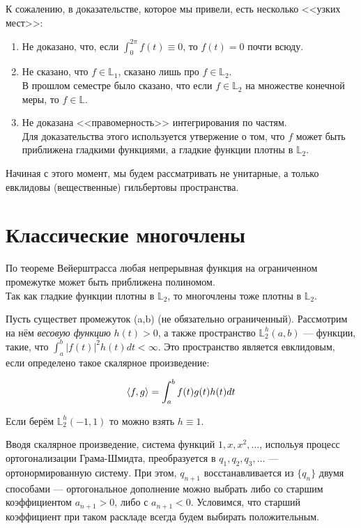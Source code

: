\documentclass[12pt]{article}
\begin{document}
	К сожалению, в доказательстве, которое мы привели, есть несколько <<узких мест>>:
	\begin{enumerate}
		\item Не доказано, что, если $\int_0^{2\pi} f(t) \equiv 0$, то $f(t) = 0$ почти всюду.
		\item Не сказано, что $f \in \mathbb{L}_1$, сказано лишь про $f \in \mathbb{L}_2$. \\
		В прошлом семестре было сказано, что если $f \in \mathbb{L}_2$ на множестве конечной меры, то $f \in \mathbb{L}$.
		\item Не доказана <<правомерность>> интегрирования по частям. \\
		Для доказательства этого используется утвержение о том, что $f$ может быть приближена гладкими функциями, а
		гладкие функции плотны в $\mathbb{L}_2$.
	\end{enumerate}
	
	Начиная с этого момент, мы будем рассматривать не унитарные, а только евклидовы (вещественные) гильбертовы пространства.
	
	\section{Классические многочлены}
	По теореме Вейерштрасса любая непрерывная функция на ограниченном промежутке может быть приближена полиномом. \\
	Так как гладкие функции плотны в $\mathbb{L}_2$, то многочлены тоже плотны в $\mathbb{L}_2$.
	
	Пусть существет промежуток (a,b) (не обязательно ограниченный). Рассмотрим на нём \textit{весовую функцию} 
	$h(t) > 0$, а также пространство
	$\mathbb{L}_2^h (a,b)$ --- функции, такие, что $\int_a^b |f(t)|^2 h(t) dt < \infty$.
	Это пространство является евклидовым, если определено такое скалярное произведение:
	
	$$ \left\langle f, g \right\rangle = \int_a^b f(t) g(t) h(t) dt $$
	
	Если берём $\mathbb{L}_2^h (-1, 1)$ то можно взять $h \equiv 1$.
	
	Вводя скалярное произведение, система функций
	$1, x, x^2, \ldots$, испольуя процесс ортогонализации Грама-Шмидта, преобразуется в $q_1, q_2, q_3, \ldots$ --- ортонормированную 
	систему. При этом, $q_{n+1}$ восстанавливается из $ \{ q_n \} $ двумя способами --- ортогональное дополнение можно выбрать либо
	со старшим коэффициентом $a_{n+1} > 0$, либо с $a_{n+1} < 0$. Условимся, что старший коэффициент при таком раскладе всегда будем 
	выбирать положительным.
	
\end{document}
